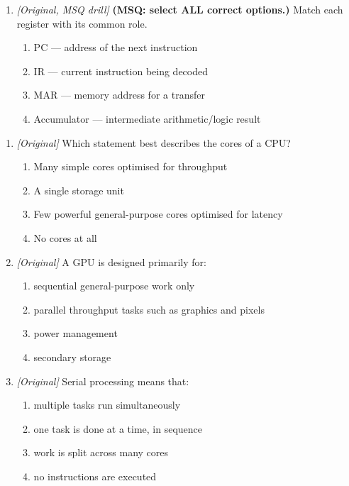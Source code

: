 \begin{enumerate}[label=\textbf{Q\arabic*.}, leftmargin=*]
\item \textit{[Original, MSQ drill]} \textbf{(MSQ: select ALL correct options.)} Match each register with its common role.
  \begin{enumerate}[label=\Alph*.]
\item PC --- address of the next instruction
   \item IR --- current instruction being decoded
   \item MAR --- memory address for a transfer
   \item Accumulator --- intermediate arithmetic/logic result
  \end{enumerate}

\end{enumerate}
\begin{enumerate}[label=\textbf{Q\arabic*.}, leftmargin=*]
\item \textit{[Original]} Which statement best describes the cores of a CPU?
  \begin{enumerate}[label=\Alph*.]
    \item Many simple cores optimised for throughput
    \item A single storage unit
    \item Few powerful general-purpose cores optimised for latency
    \item No cores at all
  \end{enumerate}
\item \textit{[Original]} A GPU is designed primarily for:
  \begin{enumerate}[label=\Alph*.]
    \item sequential general-purpose work only
    \item parallel throughput tasks such as graphics and pixels
    \item power management
    \item secondary storage
  \end{enumerate}
\item \textit{[Original]} Serial processing means that:
  \begin{enumerate}[label=\Alph*.]
    \item multiple tasks run simultaneously
    \item one task is done at a time, in sequence
    \item work is split across many cores
    \item no instructions are executed
  \end{enumerate}

\end{enumerate}

